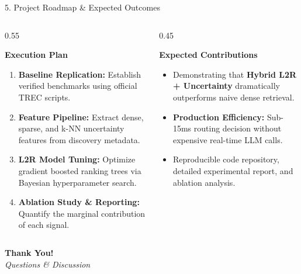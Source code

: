 \documentclass[aspectratio=169, 10pt]{beamer}
\begin{document}
\begin{frame}{5. Project Roadmap \& Expected Outcomes}
    \begin{columns}[T]
        \begin{column}{0.55\textwidth}
            \begin{block}{\textbf{Execution Plan}}
                \begin{enumerate}
                    \item \textbf{Baseline Replication:} Establish verified benchmarks using official TREC scripts.
                    \item \textbf{Feature Pipeline:} Extract dense, sparse, and k-NN uncertainty features from discovery metadata.
                    \item \textbf{L2R Model Tuning:} Optimize gradient boosted ranking trees via Bayesian hyperparameter search.
                    \item \textbf{Ablation Study \& Reporting:} Quantify the marginal contribution of each signal.
                \end{enumerate}
            \end{block}
        \end{column}

        \begin{column}{0.45\textwidth}
            \begin{exampleblock}{\textbf{Expected Contributions}}
                \begin{itemize}
                    \item Demonstrating that \textbf{Hybrid L2R + Uncertainty} dramatically outperforms naive dense retrieval.
                    \item \textbf{Production Efficiency:} Sub-15ms routing decision without expensive real-time LLM calls.
                    \item Reproducible code repository, detailed experimental report, and ablation analysis.
                \end{itemize}
            \end{exampleblock}
        \end{column}
    \end{columns}

    \vspace{0.5cm}
    \begin{center}
        \large \textbf{Thank You!} \\
        \normalsize \textit{Questions \& Discussion}
    \end{center}
\end{frame}
\end{document}
